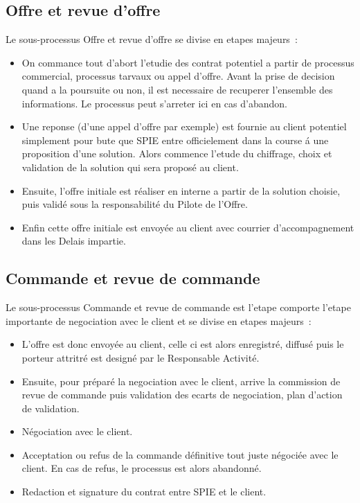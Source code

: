 \subsection{Offre et revue d'offre}

Le sous-processus Offre et revue d'offre se divise en etapes majeurs~:

\begin{itemize}
    \item On commance tout d'abort l'etudie des contrat potentiel a partir de processus commercial,
    processus tarvaux ou appel d'offre. Avant la prise de decision quand a la poursuite ou non,
    il est necessaire de recuperer l'ensemble des informations. Le processus peut s'arreter ici
    en cas d'abandon.
    \item Une reponse (d'une appel d'offre par exemple) est fournie au client potentiel simplement
    pour bute que SPIE entre officielement dans la course \'a une proposition d'une solution. Alors
    commence l'etude du chiffrage, choix et validation de la solution qui sera propos\'e au client.
    \item Ensuite, l'offre initiale est r\'ealiser en interne a partir de la solution choisie, puis
    valid\'e sous la responsabilit\'e du Pilote de l'Offre.
    \item Enfin cette offre initiale est envoy\'ee au client avec courrier d'accompagnement dans les
    Delais impartie.
\end{itemize}

\subsection{Commande et revue de commande}

Le sous-processus Commande et revue de commande est l'etape comporte l'etape importante de negociation
avec le client et se divise en etapes majeurs~:

\begin{itemize}
    \item L'offre est donc envoy\'ee au client, celle ci est alors enregistr\'e, diffus\'e puis le
    porteur attritr\'e est design\'e par le Responsable Activit\'e.
    \item Ensuite, pour pr\'epar\'e la negociation avec le client, arrive la commission de revue de
    commande puis validation des ecarts de negociation, plan d'action de validation.
    \item N\'egociation avec le client.
    \item Acceptation ou refus de la commande d\'efinitive tout juste n\'egoci\'ee avec le client.
    En cas de refus, le processus est alors abandonn\'e.
    \item Redaction et signature du contrat entre SPIE et le client.
\end{itemize}

